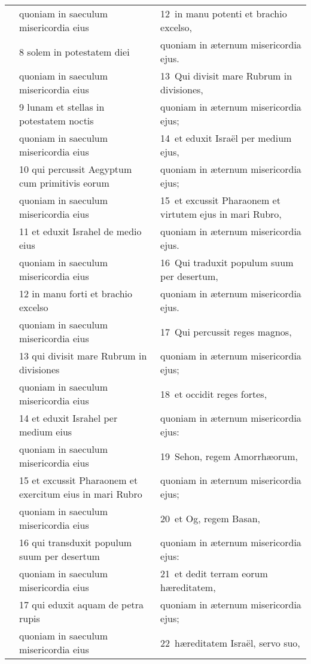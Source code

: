 \documentclass{article}
\begin{document}
\begin{longtable}{@{}p{}p{}p{}@{}}
	&	quoniam in saeculum misericordia eius	&	12 in manu potenti et brachio excelso,	\\
	&	8 solem in potestatem diei	&	quoniam in æternum misericordia ejus.	\\
	&	quoniam in saeculum misericordia eius	&	13 Qui divisit mare Rubrum in divisiones,	\\
	&	9 lunam et stellas in potestatem noctis	&	quoniam in æternum misericordia ejus;	\\
	&	quoniam in saeculum misericordia eius	&	14 et eduxit Israël per medium ejus,	\\
	&	10 qui percussit Aegyptum cum primitivis eorum	&	quoniam in æternum misericordia ejus;	\\
	&	quoniam in saeculum misericordia eius	&	15 et excussit Pharaonem et virtutem ejus in mari Rubro,	\\
	&	11 et eduxit Israhel de medio eius	&	quoniam in æternum misericordia ejus.	\\
	&	quoniam in saeculum misericordia eius	&	16 Qui traduxit populum suum per desertum,	\\
	&	12 in manu forti et brachio excelso	&	quoniam in æternum misericordia ejus.	\\
	&	quoniam in saeculum misericordia eius	&	17 Qui percussit reges magnos,	\\
	&	13 qui divisit mare Rubrum in divisiones	&	quoniam in æternum misericordia ejus;	\\
	&	quoniam in saeculum misericordia eius	&	18 et occidit reges fortes,	\\
	&	14 et eduxit Israhel per medium eius	&	quoniam in æternum misericordia ejus:	\\
	&	quoniam in saeculum misericordia eius	&	19 Sehon, regem Amorrhæorum,	\\
	&	15 et excussit Pharaonem et exercitum eius in mari Rubro	&	quoniam in æternum misericordia ejus;	\\
	&	quoniam in saeculum misericordia eius	&	20 et Og, regem Basan,	\\
	&	16 qui transduxit populum suum per desertum	&	quoniam in æternum misericordia ejus:	\\
	&	quoniam in saeculum misericordia eius	&	21 et dedit terram eorum hæreditatem,	\\
	&	17 qui eduxit aquam de petra rupis	&	quoniam in æternum misericordia ejus;	\\
	&	quoniam in saeculum misericordia eius	&	22 hæreditatem Israël, servo suo,	\\

\end{longtable}
\end{document}
